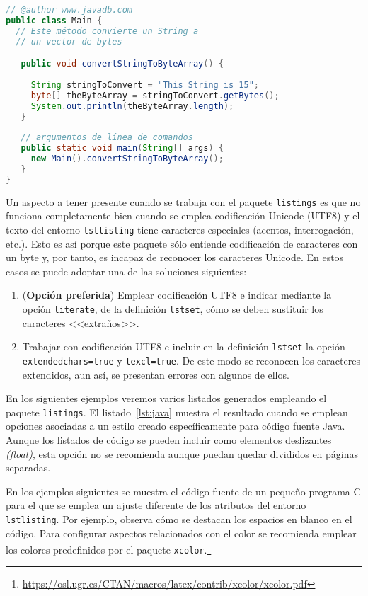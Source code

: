 \documentclass[11pt,a4paper]{article}
\begin{document}
\begin{lstlisting}[language=Java,caption={[Código fuente en Java]Ejemplo de código fuente en lenguaje Java},label=lst:java]
// @author www.javadb.com
public class Main {    
  // Este método convierte un String a
  // un vector de bytes

   public void convertStringToByteArray() {
        
     String stringToConvert = "This String is 15";      
     byte[] theByteArray = stringToConvert.getBytes();        
     System.out.println(theByteArray.length);        
   }
    
   // argumentos de línea de comandos 
   public static void main(String[] args) {
     new Main().convertStringToByteArray();
   }
}
\end{lstlisting}

Un aspecto a tener presente cuando se trabaja con el paquete \texttt{listings} es que no funciona completamente bien cuando se emplea codificación Unicode (UTF8) y el texto del entorno \texttt{lstlisting} tiene caracteres especiales (acentos, interrogación, etc.). Esto es así porque este paquete sólo entiende codificación de caracteres con un byte y, por tanto, es incapaz de reconocer los caracteres Unicode. En estos casos se puede adoptar una de las soluciones siguientes: 

\begin{enumerate}
	\item (\textbf{Opción preferida}) Emplear codificación UTF8 e indicar mediante la opción \texttt{literate}, de la definición \texttt{lstset}, cómo se deben sustituir los caracteres <<extraños>>. 
	\item Trabajar con codificación UTF8 e incluir en la definición \texttt{lstset} la opción \texttt{extendedchars=true} y \texttt{texcl=true}. De este modo se reconocen los caracteres extendidos, aun así, se presentan errores con algunos de ellos.
\end{enumerate}

En los siguientes ejemplos veremos varios listados generados empleando el paquete \texttt{listings}. El listado~\ref{lst:java} muestra el resultado cuando se emplean opciones asociadas a un estilo creado específicamente para código fuente Java. Aunque los listados de código se pueden incluir como elementos deslizantes \emph{(float)}, esta opción no se recomienda aunque puedan quedar divididos en páginas separadas.

En los ejemplos siguientes se muestra el código fuente de un pequeño programa C para el que se emplea un ajuste diferente de los atributos del entorno \texttt{lstlisting}. Por ejemplo, observa cómo se destacan los espacios en blanco en el código. Para configurar aspectos relacionados con el color se recomienda emplear los colores predefinidos por el paquete \texttt{xcolor}.\footnote{\url{https://osl.ugr.es/CTAN/macros/latex/contrib/xcolor/xcolor.pdf}}
\end{document}
